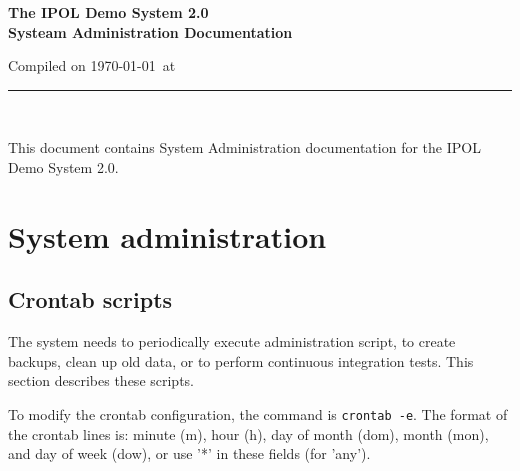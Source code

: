 \documentclass[a4paper,12pt]{article}
\begin{document}
\begin{titlepage}

\begin{center}
\vspace*{-1in}

\vspace*{0.6in}
\begin{Large}
\textbf{The IPOL Demo System 2.0 \\Systeam Administration Documentation} \\
\end{Large}

\vspace*{0.6in}

\small{Compiled on \today\ at \currenttime}

\vspace*{0.6in}
\rule{80mm}{0.1mm}\\
\vspace*{0.1in}
\end{center}

\end{titlepage}

This document contains System Administration documentation for the IPOL Demo System 2.0.
\vspace*{0.6in}


\newpage

\tableofcontents
\newpage
\listoffigures
\newpage



\section{System administration}

\subsection{Crontab scripts}
The system needs to periodically execute administration script, to create backups, clean up old data, or to perform continuous integration tests. This section describes these scripts.

To modify the crontab configuration, the command is {\tt crontab -e}. The format of the crontab lines is: minute (m), hour (h), day of month (dom), month (mon), and day of week (dow), or use '*' in these fields (for 'any').
\end{document}
